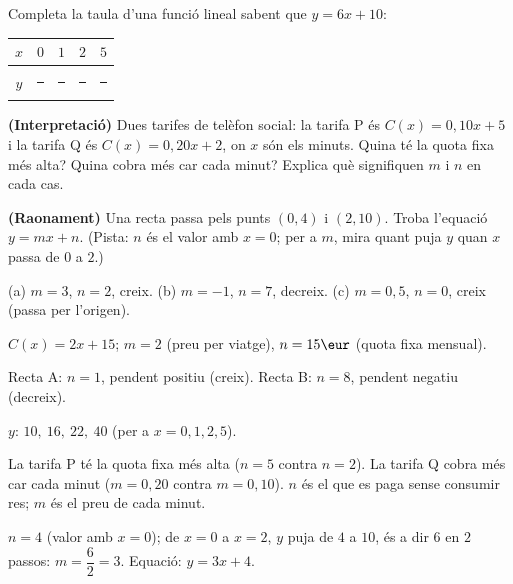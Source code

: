 \begin{exercicis}
\begin{exlist}
  \item Completa la taula d'una funció lineal sabent que $y=6x+10$:
        \begin{center}
        \begin{tabular}{c c c c c}
        \toprule
        $x$ & $0$ & $1$ & $2$ & $5$ \\
        \midrule
        $y$ & \rule{1.2cm}{0.4pt} & \rule{1.2cm}{0.4pt} & \rule{1.2cm}{0.4pt} & \rule{1.2cm}{0.4pt} \\
        \bottomrule
        \end{tabular}
        \end{center}
  \item \textbf{(Interpretació)} Dues tarifes de telèfon social: la tarifa P és
        $C(x)=0,10x+5$ i la tarifa Q és $C(x)=0,20x+2$, on $x$ són els minuts. Quina
        té la quota fixa més alta? Quina cobra més car cada minut? Explica què
        signifiquen $m$ i $n$ en cada cas.
  \item \textbf{(Raonament)} Una recta passa pels punts $(0,4)$ i $(2,10)$. Troba
        l'equació $y=mx+n$. (Pista: $n$ és el valor amb $x=0$; per a $m$, mira quant
        puja $y$ quan $x$ passa de $0$ a $2$.)
\end{exlist}
\end{exercicis}

\begin{solucions}
\begin{sollist}
  \item (a) $m=3$, $n=2$, creix. \quad (b) $m=-1$, $n=7$, decreix. \quad
        (c) $m=0,5$, $n=0$, creix (passa per l'origen).
  \item $C(x)=2x+15$; $m=2$ (preu per viatge), $n=15\eur$ (quota fixa mensual).
  \item Recta A: $n=1$, pendent positiu (creix). \quad
        Recta B: $n=8$, pendent negatiu (decreix).
  \item $y$: \quad $10,\ 16,\ 22,\ 40$ \quad (per a $x=0,1,2,5$).
  \item La tarifa P té la quota fixa més alta ($n=5$ contra $n=2$). La tarifa Q
        cobra més car cada minut ($m=0,20$ contra $m=0,10$). $n$ és el que es paga
        sense consumir res; $m$ és el preu de cada minut.
  \item $n=4$ (valor amb $x=0$); de $x=0$ a $x=2$, $y$ puja de $4$ a $10$, és a dir
        $6$ en $2$ passos: $m=\dfrac{6}{2}=3$. Equació: $y=3x+4$.
\end{sollist}
\end{solucions}
